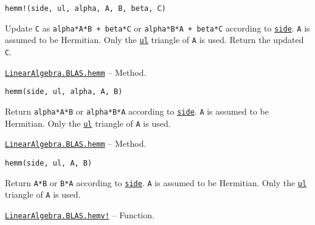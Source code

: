 \begin{adjustwidth}{2em}{0pt}


\begin{verbatim}
hemm!(side, ul, alpha, A, B, beta, C)
\end{verbatim}

Update \texttt{C} as \texttt{alpha*A*B + beta*C} or \texttt{alpha*B*A + beta*C} according to \hyperlink{3128026147631247774}{\texttt{side}}. \texttt{A} is assumed to be Hermitian. Only the \hyperlink{13880289478825450693}{\texttt{ul}} triangle of \texttt{A} is used. Return the updated \texttt{C}.



\end{adjustwidth}
\hypertarget{6201781936415538210}{} 
\hyperlink{6201781936415538210}{\texttt{LinearAlgebra.BLAS.hemm}}  -- {Method.}

\begin{adjustwidth}{2em}{0pt}


\begin{verbatim}
hemm(side, ul, alpha, A, B)
\end{verbatim}

Return \texttt{alpha*A*B} or \texttt{alpha*B*A} according to \hyperlink{3128026147631247774}{\texttt{side}}. \texttt{A} is assumed to be Hermitian. Only the \hyperlink{13880289478825450693}{\texttt{ul}} triangle of \texttt{A} is used.



\end{adjustwidth}
\hypertarget{4698646581937392256}{} 
\hyperlink{4698646581937392256}{\texttt{LinearAlgebra.BLAS.hemm}}  -- {Method.}

\begin{adjustwidth}{2em}{0pt}


\begin{verbatim}
hemm(side, ul, A, B)
\end{verbatim}

Return \texttt{A*B} or \texttt{B*A} according to \hyperlink{3128026147631247774}{\texttt{side}}. \texttt{A} is assumed to be Hermitian. Only the \hyperlink{13880289478825450693}{\texttt{ul}} triangle of \texttt{A} is used.



\end{adjustwidth}
\hypertarget{9920007331130447492}{} 
\hyperlink{9920007331130447492}{\texttt{LinearAlgebra.BLAS.hemv!}}  -- {Function.}

